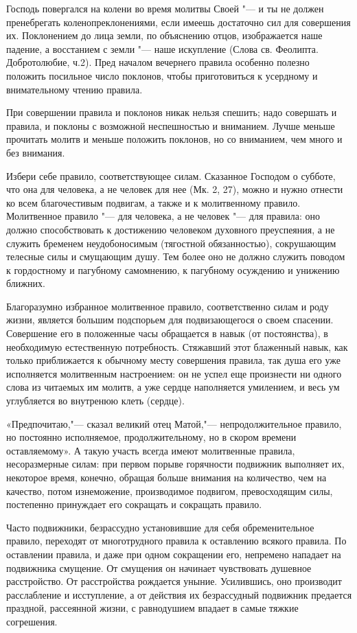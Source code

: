 {{{{Господь повергался на колени во время молитвы Своей "--- и ты не должен пренебрегать коленопреклонениями, если имеешь достаточно сил для совершения их. Поклонением до лица земли, по объяснению отцов, изображается наше падение, а восстанием с земли "--- наше искупление (Слова св. Феолипта. Добротолюбие, ч.2). Пред началом вечернего правила особенно полезно положить посильное число поклонов, чтобы приготовиться к усердному и внимательному чтению правила.

При совершении правила и поклонов никак нельзя спешить; надо совершать и правила, и поклоны с возможной неспешностью и вниманием. Лучше меньше прочитать молитв и меньше положить поклонов, но со вниманием, чем много и без внимания.

Избери себе правило, соответствующее силам. Сказанное Господом о субботе, что она для человека, а не человек для нее (Мк. 2, 27), можно и нужно отнести ко всем благочестивым подвигам, а также и к молитвенному правило. Молитвенное правило "--- для человека, а не человек "--- для правила: оно должно способствовать к достижению человеком духовного преуспеяния, а не служить бременем неудобоносимым (тягостной обязанностью), сокрушающим телесные силы и смущающим душу. Тем более оно не должно служить поводом к гордостному и пагубному самомнению, к пагубному осуждению и унижению ближних.

Благоразумно избранное молитвенное правило, соответственно силам и роду жизни, является большим подспорьем для подвизающегося о своем спасении. Совершение его в положенные часы обращается в навык (от постоянства), в необходимую естественную потребность. Стяжавший этот блаженный навык, как только приближается к обычному месту совершения правила, так душа его уже исполняется молитвенным настроением: он не успел еще произнести ни одного слова из читаемых им молитв, а уже сердце наполняется умилением, и весь ум углубляется во внутренюю клеть (сердце).

«Предпочитаю,"--- сказал великий отец Матой,"--- непродолжительное правило, но постоянно исполняемое, продолжительному, но в скором времени оставляемому». А такую участь всегда имеют молитвенные правила, несоразмерные силам: при первом порыве горячности подвижник выполняет их, некоторое время, конечно, обращая больше внимания на количество, чем на качество, потом изнеможение, производимое подвигом, превосходящим силы, постепенно принуждает его сокращать и сокращать правило.

Часто подвижники, безрассудно установившие для себя обременительное правило, переходят от многотрудного правила к оставлению всякого правила. По оставлении правила, и даже при одном сокращении его, непремено нападает на подвижника смущение. От смущения он начинает чувствовать душевное расстройство. От расстройства рождается уныние. Усилившись, оно производит расслабление и исступление, а от действия их безрассудный подвижник предается праздной, рассеянной жизни, с равнодушием впадает в самые тяжкие согрешения.

}}}}
